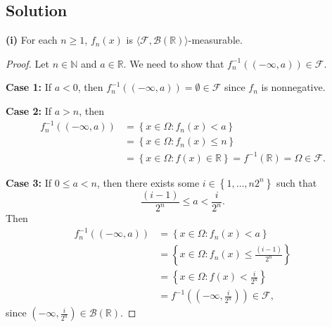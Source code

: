 \documentclass[12pt]{article}
\begin{document}
\subsection*{Solution}
{\bf (i)} For each $n\geq 1$, $f_{n}(x)$ is $\langle\mathcal{F}, \mathcal{B}(\mathbb{R})\rangle$-measurable. 
\begin{proof}
Let $n \in \mathbb{N}$ and $a \in \mathbb{R}$. We need to show that $f_{n}^{-1}\left( (-\infty, a) \right) \in \mathcal{F}$.

{\bf Case 1:} If $a < 0$, then $f_{n}^{-1}\left( (-\infty, a) \right) = \emptyset \in \mathcal{F}$ since $f_{n}$ is nonnegative.

{\bf Case 2:} If $a > n$, then 
\begin{align*}
f_{n}^{-1}\left( (-\infty, a) \right) & = \left\{ x \in \Omega : f_{n}(x) < a \right\} \\
& = \left\{ x \in \Omega : f_{n}(x) \leq n \right\} \\
& = \left\{ x \in \Omega : f(x) \in \mathbb{R} \right\} = f^{-1}(\mathbb{R}) = \Omega \in \mathcal{F}.
\end{align*}

{\bf Case 3:} If $0 \leq a < n$, then there exists some $i \in \left\{ 1, \hdots, n2^{n} \right\}$ such that 
\[ \frac{(i-1)}{2^{n}} \leq a < \frac{i}{2^{n}}. \]
Then 
\begin{align*}
f_{n}^{-1}\left( (-\infty, a) \right) & = \left\{ x \in \Omega : f_{n}(x) < a \right\} \\
& = \left\{ x \in \Omega : f_{n}(x) \leq \frac{(i-1)}{2^{n}} \right\} \\
& = \left\{ x \in \Omega : f(x) < \frac{i}{2^{n}} \right\} \\
& = f^{-1}\left( \left(-\infty, \frac{i}{2^{n}}\right) \right) \in \mathcal{F},
\end{align*}
since $\left(-\infty, \frac{i}{2^{n}}\right) \in \mathcal{B}(\mathbb{R})$.
\end{proof}

\vspace{10mm}
\end{document}
